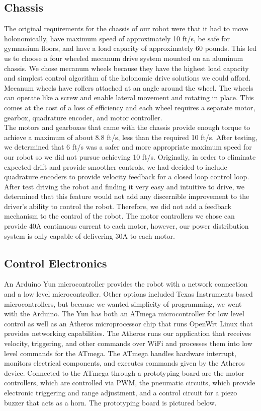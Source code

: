\documentclass[letterpaper,12pt]{article}
\begin{document}
\subsection{Chassis}
The original requirements for the chassis of our robot were that it had to move
holonomically, have maximum speed of approximately 10
ft/s, be safe for gymnasium floors, and have a load capacity of approximately
60 pounds. This led us to choose a four wheeled mecanum drive
system mounted on an aluminum chassis. We chose mecanum wheels because they
have the highest load capacity and simplest control algorithm of the holonomic
drive solutions we could afford. Mecanum wheels have rollers attached at an
angle around the wheel. The wheels can operate like a screw and enable lateral
movement and rotating in place. This comes at the cost of a loss of efficiency
and each wheel requires a separate motor, gearbox, quadrature encoder, and
motor controller.\\

The motors and gearboxes that came with the chassis provide enough torque to
achieve a maximum of about 8.8 ft/s, less than the required 10 ft/s. After
testing, we determined that 6 ft/s was a safer and more appropriate maximum
speed for our robot so we did not pursue achieving 10 ft/s.  Originally, in
order to eliminate expected drift and provide smoother controls, we had decided
to include quadrature encoders to provide velocity feedback for a closed loop
control loop. After test driving the robot and finding it very easy and
intuitive to drive, we determined that this feature would not add any
discernible improvement to the driver's ability to control the robot.
Therefore, we did not add a feedback mechanism to the control of the robot. The
motor controllers we chose can provide 40A continuous current to each motor,
however, our power distribution system is only capable of delivering 30A to
each motor.\\

\subsection{Control Electronics}
An Arduino Yun microcontroller provides the robot with a network connection and
a low level microcontroller. Other options included Texas Instruments based
microcontrollers, but because we wanted simplicity of programming, we went with
the Arduino. The Yun has both an ATmega microcontroller for low level control
as well as an Atheros microprocessor chip that runs OpenWrt Linux that provides
networking capabilities. The Atheros runs our application that receives
velocity, triggering, and other commands over WiFi and processes them into low
level commands for the ATmega. The ATmega handles hardware interrupt, monitors
electrical components, and executes commands given by the Atheros device.
Connected to the ATmega through a prototyping board are the motor controllers,
which are controlled via PWM, the pneumatic circuits, which provide electronic
triggering and range adjustment, and a control circuit for a piezo buzzer that
acts as a horn. The prototyping board is pictured below.\\
\end{document}
